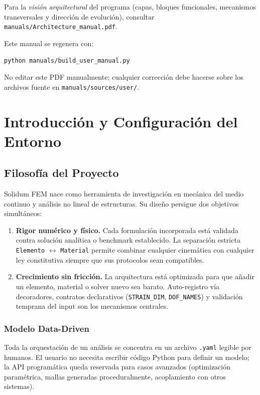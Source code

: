 \documentclass[11pt,oneside]{report}
\begin{document}
Para la \emph{visión arquitectural} del programa (capas, bloques funcionales, mecanismos transversales y dirección de evolución), consultar \texttt{manuals/Architecture\_manual.pdf}.

Este manual se regenera con:
\begin{center}\texttt{python manuals/build\_user\_manual.py}\end{center}

\noindent No editar este PDF manualmente; cualquier corrección debe hacerse sobre los archivos fuente en \texttt{manuals/sources/user/}.

\newpage
{}
\setcounter{page}{1}


\chapter{Introducción y Configuración del Entorno}
\label{cap:1}



\section{Filosofía del Proyecto}

Solidum FEM nace como herramienta de investigación en mecánica del medio continuo y análisis no lineal de estructuras. Su diseño persigue dos objetivos simultáneos:

\begin{enumerate}
  \item \textbf{Rigor numérico y físico.} Cada formulación incorporada está validada contra solución analítica o benchmark establecido. La separación estricta \texttt{Elemento} \ensuremath{\leftrightarrow} \texttt{Material} permite combinar cualquier cinemática con cualquier ley constitutiva siempre que sus protocolos sean compatibles.
  \item \textbf{Crecimiento sin fricción.} La arquitectura está optimizada para que añadir un elemento, material o solver nuevo sea barato. Auto-registro vía decoradores, contratos declarativos (\texttt{STRAIN\_DIM}, \texttt{DOF\_NAMES}) y validación temprana del input son los mecanismos centrales.
\end{enumerate}

\subsection{Modelo Data-Driven}

Toda la orquestación de un análisis se concentra en un archivo \texttt{.yaml} legible por humanos. El usuario no necesita escribir código Python para definir un modelo; la API programática queda reservada para casos avanzados (optimización paramétrica, mallas generadas proceduralmente, acoplamiento con otros sistemas).
\end{document}
